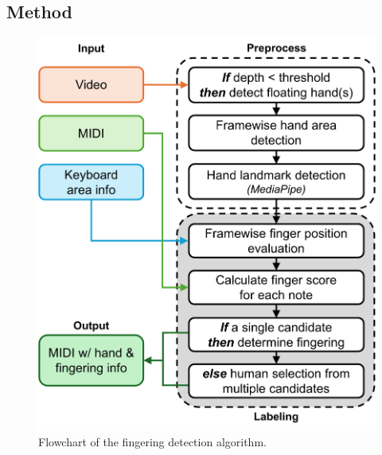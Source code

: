 \documentclass{article}
\begin{document}
\subsection{Method}
% 
\begin{figure}[!t]
    \centering
    \includegraphics[width=0.9\linewidth]{Images/fingering_detection3.pdf}\hspace*{0cm}
    \caption{Flowchart of the fingering detection algorithm.}
    \label{fig:fingering_diagram}
\end{figure}
\end{document}
